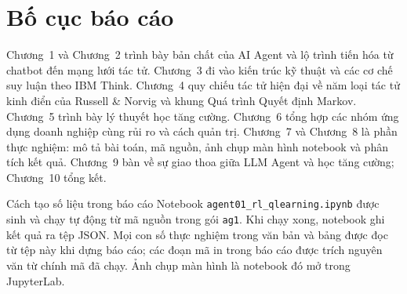 \section*{Bố cục báo cáo}
Chương~1 và Chương~2 trình bày bản chất của AI Agent và lộ trình tiến hóa từ chatbot đến mạng lưới tác tử. Chương~3 đi vào
kiến trúc kỹ thuật và các cơ chế suy luận theo IBM Think. Chương~4 quy chiếu tác tử hiện đại về năm loại tác tử kinh điển
của Russell \& Norvig \cite{russell_norvig} và khung Quá trình Quyết định Markov. Chương~5 trình bày lý thuyết học tăng
cường. Chương~6 tổng hợp các nhóm ứng dụng doanh nghiệp cùng rủi ro và cách quản trị. Chương~7 và Chương~8 là phần thực
nghiệm: mô tả bài toán, mã nguồn, ảnh chụp màn hình notebook và phân tích kết quả. Chương~9 bàn về sự giao thoa giữa LLM
Agent và học tăng cường; Chương~10 tổng kết.

\begin{phathien}{Cách tạo số liệu trong báo cáo}
Notebook \texttt{agent01\_rl\_qlearning.ipynb} được sinh và chạy tự động từ mã nguồn trong gói \texttt{ag1}. Khi chạy xong,
notebook ghi kết quả ra tệp JSON. Mọi con số thực nghiệm trong văn bản và bảng được đọc từ tệp này khi dựng báo cáo; các
đoạn mã in trong báo cáo được trích nguyên văn từ chính mã đã chạy. Ảnh chụp màn hình là notebook đó mở trong JupyterLab.
\end{phathien}
